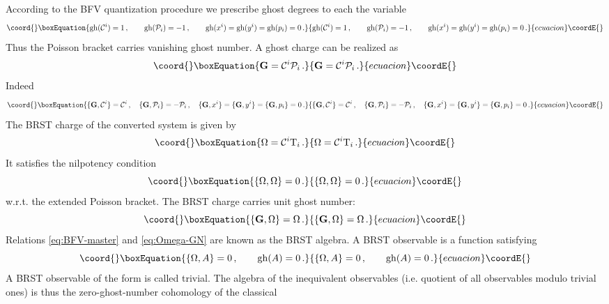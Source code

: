 \documentclass[a4paper,11pt,oneside]{amsart}
\theoremstyle{plain}
\numberwithin{equation}{section} %
\numberwithin{figure}{section} %
\providecommand{\pb}[2]{\left\{{}#1{},{}#2{}\right\}}
\providecommand{\gh}[1]{{\rm gh}(#1)}
\def\cP{{\mathcal P}}
\def\cc{{\mathcal C}}
\def\cT{{\rm T}}
\def\G{{ \bf G}}
\begin{document}
\noindent
According to the BFV quantization procedure
we prescribe ghost degrees to each the variable
\begin{equation}\coord{}\boxEquation{
\gh{\cc^i}=1\,, \qquad \gh{\cP_i}=-1\,, \qquad
\gh{x^i}=\gh{y^i}=\gh{p_i}=0\,.
}{
\gh{\cc^i}=1\,, \qquad \gh{\cP_i}=-1\,, \qquad
\gh{x^i}=\gh{y^i}=\gh{p_i}=0\,.
}{ecuacion}\coordE{}\end{equation}
Thus the Poisson bracket carries vanishing ghost
number.  A ghost charge \myHighlight{$\G$}\coordHE{} can be realized as
\begin{equation}\coord{}\boxEquation{
  \label{eq:ghost-charge}
\G=\cc^i\cP_i  \,.
}{
  \G=\cc^i\cP_i  \,.
}{ecuacion}\coordE{}\end{equation}
Indeed
\begin{equation}\coord{}\boxEquation{
\{\G,\cc^i\}=\cc^i\,,\quad \{\G,\cP_i\}=-\cP_i\,, \quad
\{\G,x^i\}=\{\G,y^i\}=\{\G,p_i\}=0\,.
}{
\{\G,\cc^i\}=\cc^i\,,\quad \{\G,\cP_i\}=-\cP_i\,, \quad
\{\G,x^i\}=\{\G,y^i\}=\{\G,p_i\}=0\,.
}{ecuacion}\coordE{}\end{equation}
The BRST charge of the converted system is given by
\begin{equation}\coord{}\boxEquation{
  \label{eq:Omega}
  \Omega=\cc^i \cT_i\,.
}{
  \Omega=\cc^i \cT_i\,.
}{ecuacion}\coordE{}\end{equation}
It satisfies the nilpotency condition
\begin{equation}\coord{}\boxEquation{
\label{eq:BFV-master}
\{\Omega,\Omega\}=0\,.
}{
\{\Omega,\Omega\}=0\,.
}{ecuacion}\coordE{}\end{equation}
w.r.t. the extended Poisson bracket.  The BRST charge
\myHighlight{$\Omega$}\coordHE{} carries unit ghost number:
\begin{equation}\coord{}\boxEquation{
\label{eq:Omega-GN}
\pb{\G}{\Omega}=\Omega\,.
}{
\pb{\G}{\Omega}=\Omega\,.
}{ecuacion}\coordE{}\end{equation}
Relations \eqref{eq:BFV-master} and \eqref{eq:Omega-GN}
are known as the BRST algebra.
A BRST observable is a function \coordHE{} satisfying
\begin{equation}\coord{}\boxEquation{
\pb{\Omega}{A}=0\,, \qquad \gh{A}=0\,.
}{
\pb{\Omega}{A}=0\,, \qquad \gh{A}=0\,.
}{ecuacion}\coordE{}\end{equation}
A BRST observable of the form \myHighlight{$\pb{\Omega}{B}$}\coordHE{}
is called trivial.  The algebra of the inequivalent observables
(i.e. quotient of all observables modulo trivial ones)
is thus the zero-ghost-number cohomology of the classical
\end{document}
